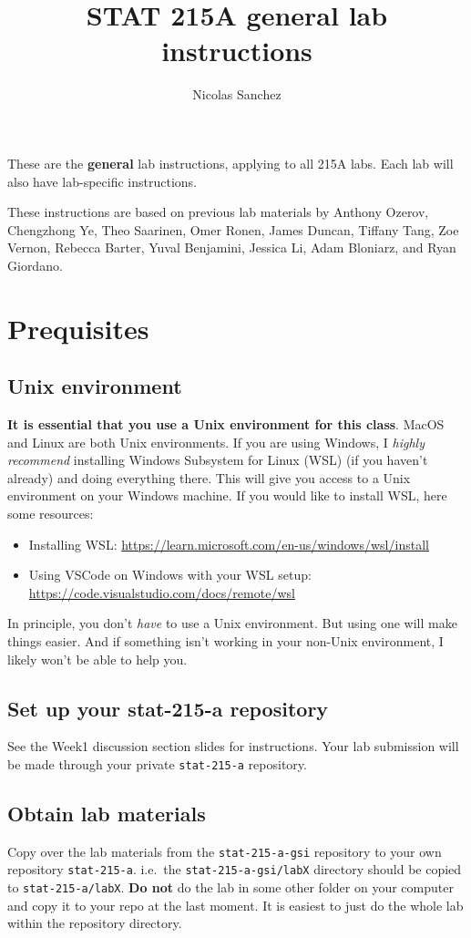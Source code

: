 \documentclass[letterpaper,12pt]{article}
\title{STAT 215A general lab instructions\vspace{-1em}}
\author{Nicolas Sanchez}
\begin{document}
\maketitle

These are the \textbf{general} lab instructions, applying to all 215A labs. Each lab will also have lab-specific instructions. 

\tableofcontents

These instructions are based on previous lab materials by Anthony Ozerov, Chengzhong Ye, Theo Saarinen, Omer Ronen, James Duncan, Tiffany Tang, Zoe Vernon, Rebecca Barter, Yuval Benjamini, Jessica Li, Adam Bloniarz, and Ryan Giordano.


\section{Prequisites}
\subsection{Unix environment}
\textbf{It is essential that you use a Unix environment for this class}. MacOS and Linux are both Unix environments. If you are using Windows, I \textit{highly recommend} installing Windows Subsystem for Linux (WSL) (if you haven't already) and doing everything there. This will give you access to a Unix environment on your Windows machine. If you would like to install WSL, here some resources:
\begin{itemize}
    \item Installing WSL: \url{https://learn.microsoft.com/en-us/windows/wsl/install}
    \item Using VSCode on Windows with your WSL setup: \url{https://code.visualstudio.com/docs/remote/wsl}
\end{itemize}
In principle, you don't \textit{have} to use a Unix environment. But using one will make things easier. And if something isn't working in your non-Unix environment, I likely won't be able to help you.
\subsection{Set up your stat-215-a repository}
See the Week1 discussion section slides for instructions. Your lab submission will be made through your private \texttt{stat-215-a} repository.
\subsection{Obtain lab materials}
Copy over the lab materials from the \texttt{stat-215-a-gsi} repository to your own repository \texttt{stat-215-a}. i.e.~the \texttt{stat-215-a-gsi/labX} directory should be copied to \texttt{stat-215-a/labX}. \textbf{Do not} do the lab in some other folder on your computer and copy it to your repo at the last moment. It is easiest to just do the whole lab within the repository directory.
\end{document}
